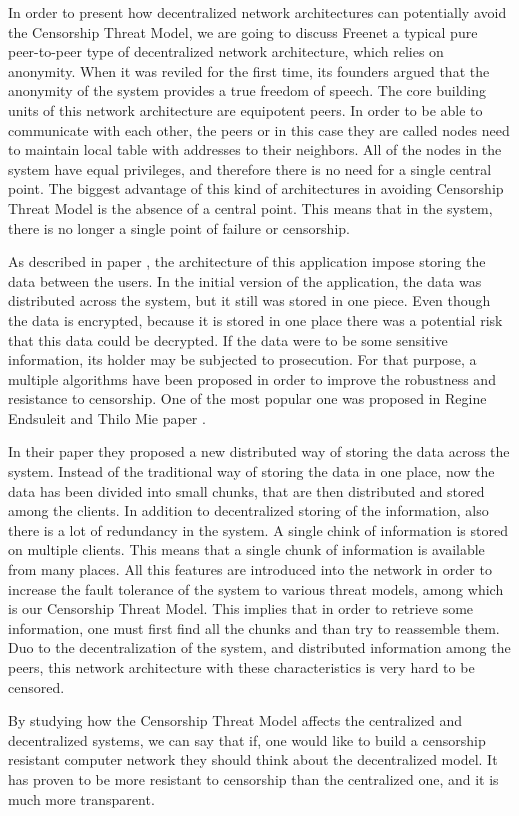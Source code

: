 In order to present how decentralized network architectures can potentially avoid the Censorship Threat Model, we are going to discuss Freenet \cite{clarke2001} a typical pure peer-to-peer \cite{web:peertopeer} type of decentralized network architecture, which relies on anonymity. When it was reviled for the first time, its founders argued that the anonymity of the system provides a true freedom of speech. The core building units of this network architecture are equipotent peers. In order to be able to communicate with each other, the peers or in this case they are called nodes need to maintain local table with addresses to their neighbors. All of the nodes in the system have equal privileges, and therefore there is no need for a single central point. The biggest advantage of this kind of architectures in avoiding Censorship Threat Model is the absence of a central point. This means that in the system, there is no longer a single point of failure or censorship.  

As described in paper \cite{clarke2001}, the architecture of this application impose storing the data between the users. In the initial version of the application, the data was distributed across the system, but it still was stored in one piece. Even though the data is encrypted, because it is stored in one place there was a potential risk that this data could be decrypted. If the data were to be some sensitive information, its holder may be subjected to prosecution. For that purpose, a multiple algorithms have been proposed in order to improve the robustness and resistance to censorship. One of the most popular one was proposed in Regine Endsuleit and Thilo Mie paper \cite{endsuleit2006}. 

In their paper they proposed a new distributed way of storing the data across the system. Instead of the traditional way of storing the data in one place, now the data has been divided into small chunks, that are then distributed and stored among the clients. In addition to decentralized storing of the information, also there is a lot of redundancy in the system. A single chink of information is stored on multiple clients. This means that a single chunk of information is available from many places. All this features are introduced into the network in order to increase the fault tolerance of the system to various threat models, among which is our Censorship Threat Model. This implies that in order to retrieve some information, one must first find all the chunks and than try to reassemble them. Duo to the decentralization of the system, and distributed information among the peers, this network architecture with these characteristics is very hard to be censored. 

By studying how the Censorship Threat Model affects the centralized and decentralized systems, we can say that if, one would like to build a censorship resistant computer network they should think about  the decentralized model. It has proven to be more resistant to censorship than the centralized one, and it is much more transparent. 
